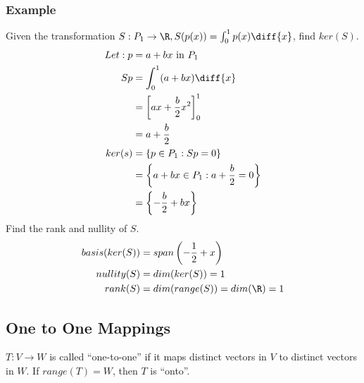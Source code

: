 \documentclass{math}
\begin{document}
\subsubsection*{Example}
Given the transformation \( S:P_1\to\R, S(p(x)) = \int_{0}^{1}p(x)\diff{x} \),
find \( ker(S) \).
\begin{align*}
  Let: p &= a+bx \text{ in } P_1 \\
  Sp &= \int_{0}^{1}(a+bx)\diff{x} \\
  &= \left[ax+\frac{b}{2}x^2\right]_{0}^{1} \\
  &= a+\frac{b}{2} \\
  ker(s) &= \{p\in P_1: Sp = 0 \} \\
  &= \left\{a+bx\in P_1: a+\frac{b}{2} = 0\right\} \\
  &= \left\{-\frac{b}{2}+bx\right\}
\end{align*}
Find the rank and nullity of \( S \).
\begin{align*}
  basis(ker(S)) &= span\left(-\frac{1}{2}+x\right) \\
  nullity(S) &= dim(ker(S)) = 1 \\
  rank(S) &= dim(range(S)) = dim(\R) = 1
\end{align*}

\subsection*{One to One Mappings}
\( T:V\to W \) is called ``one-to-one'' if it maps distinct vectors in \( V \)
to distinct vectors in \( W \). If \( range(T) = W \), then \( T \) is
``onto''.
\end{document}

